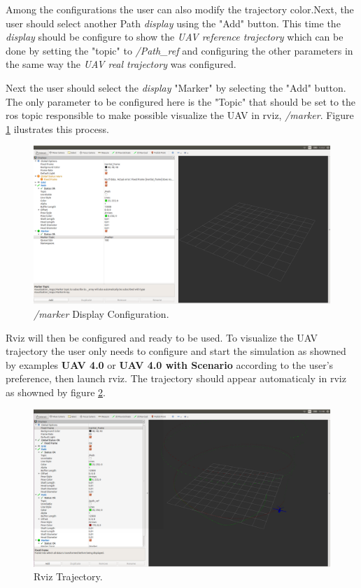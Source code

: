 		Among the configurations the user can also modify the trajectory color.Next, the user should select another Path \textit{display} using the "Add" button. This time the \textit{display} should be configure to show the \textit{UAV reference trajectory} which can be done by setting the "topic" to \textit{/Path\_ref} and configuring the other parameters in the same way the \textit{UAV real trajectory} was configured. 
		
		Next the user should select the \textit{display} "Marker" by selecting the "Add" button. The only parameter to be configured here is the "Topic" that should be set to the ros topic responsible to make possible visualize the UAV in rviz, \textit{/marker}. Figure \ref{rvizmarker} ilustrates this process.
		
		\begin{figure}[!ht]
			\centering
			\includegraphics[width=350pt]{figuras/rvizmarker.png}
			\caption{\textit{/marker} Display Configuration.}
			\label{rvizmarker}
		\end{figure}
		
		Rviz will then be configured and ready to be used. To visualize the UAV trajectory the user only needs to configure and start the simulation as showned by examples \textbf{UAV 4.0} or \textbf{UAV 4.0 with Scenario} according to the user's preference, then launch rviz. The trajectory should appear automaticaly in rviz as showned by figure \ref{rvizresult}.
		
		
		\begin{figure}[!ht]
			\centering
			\includegraphics[width=350pt]{figuras/rvizresult.png}
			\caption{Rviz Trajectory.}
			\label{rvizresult}
		\end{figure}
		
